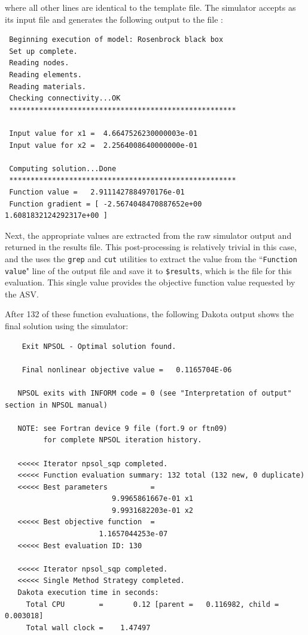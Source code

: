 where all other lines are identical to the template file. The
 simulator accepts  as its input
file and generates the following output to the file :
\begin{small}
\begin{verbatim}
 Beginning execution of model: Rosenbrock black box
 Set up complete.
 Reading nodes.
 Reading elements.
 Reading materials.
 Checking connectivity...OK
 *****************************************************

 Input value for x1 =  4.6647526230000003e-01
 Input value for x2 =  2.2564008640000000e-01

 Computing solution...Done
 *****************************************************
 Function value =   2.9111427884970176e-01
 Function gradient = [ -2.5674048470887652e+00   1.6081832124292317e+00 ]
\end{verbatim}
\end{small}

Next, the appropriate values are extracted from the raw simulator output
and returned in the results file. This post-processing is relatively
trivial in this case, and the  uses the
\texttt{grep} and \texttt{cut} utilities to extract the value from the
``\texttt{Function value}" line of the  output file and save it to
\texttt{\$results}, which is the  file for this
evaluation. This single value provides the objective function value
requested by the ASV.

After 132 of these function evaluations, the following Dakota output
shows the final solution using the  simulator:
\begin{footnotesize}
\begin{verbatim}
    Exit NPSOL - Optimal solution found.

    Final nonlinear objective value =   0.1165704E-06

   NPSOL exits with INFORM code = 0 (see "Interpretation of output" section in NPSOL manual)

   NOTE: see Fortran device 9 file (fort.9 or ftn09)
         for complete NPSOL iteration history.

   <<<<< Iterator npsol_sqp completed.
   <<<<< Function evaluation summary: 132 total (132 new, 0 duplicate)
   <<<<< Best parameters          =
                         9.9965861667e-01 x1
                         9.9931682203e-01 x2
   <<<<< Best objective function  =
                      1.1657044253e-07
   <<<<< Best evaluation ID: 130

   <<<<< Iterator npsol_sqp completed.
   <<<<< Single Method Strategy completed.
   Dakota execution time in seconds:
     Total CPU        =       0.12 [parent =   0.116982, child =   0.003018]
     Total wall clock =    1.47497
\end{verbatim}
\end{footnotesize}

